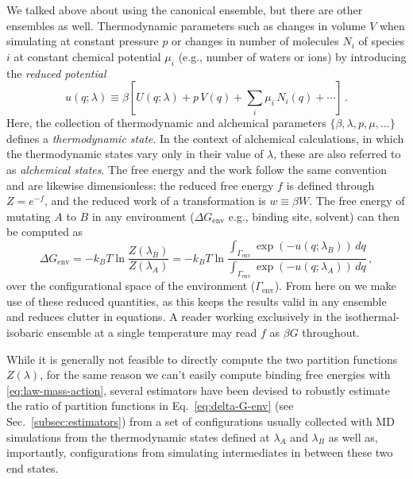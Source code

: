 \documentclass[9pt,bestpractices]{livecoms}
\begin{document}
We talked above about using the canonical ensemble, but there are
other ensembles as well. Thermodynamic parameters such as changes in
volume $V$ when simulating at constant pressure $p$ or changes in
number of molecules $N_i$ of species $i$ at constant chemical
potential $\mu_i$ (e.g., number of waters or ions) by introducing the
\textit{reduced potential}~\cite{shirts2008statisticallya}
\begin{equation}\label{eq:reduced-potential}
u(q;\lambda) \equiv \beta \left[ U(q;\lambda) + p \, V(q) + \sum_i \mu_i \, N_i(q) + \cdots \right] \, .
\end{equation}
Here, the collection of thermodynamic and alchemical parameters $\{\beta, \lambda, p, \mu, \ldots\}$ defines a \emph{thermodynamic state}.
In the context of alchemical calculations, in which the thermodynamic states vary only in their value of $\lambda$, these are also referred to as \emph{alchemical states}.
The free energy and the work follow the same convention and are likewise dimensionless: the reduced free energy $f$ is defined through $Z = e^{-f}$, and the reduced work of a transformation is $w \equiv \beta W$.
The free energy of mutating $A$ to $B$ in any environment ($\Delta G_{\mathrm{env}}$ e.g., binding site, solvent) can then be computed as
\begin{equation}\label{eq:delta-G-env}
    \Delta G_{\mathrm{env}} = - k_BT \ln \frac{Z(\lambda_B)}{Z(\lambda_A)} = - k_BT \ln \frac{\int_{\Gamma_{\mathrm{env}}} \exp\left( -u(q; \lambda_B) \right) \, dq}{\int_{\Gamma_{\mathrm{env}}} \exp\left( -u(q; \lambda_A) \right) \, dq} \, ,
\end{equation}
over the configurational space of the environment ($\Gamma_{\mathrm{env}}$). From here on we make use of these reduced quantities, as this keeps the results valid in any ensemble and reduces clutter in equations. A reader working exclusively in the isothermal-isobaric ensemble at a single temperature may read $f$ as $\beta G$ throughout.

While it is generally not feasible to directly compute the two partition functions $Z(\lambda)$, for the same reason we can't easily compute binding free energies with \ref{eq:law-mass-action}, several estimators have been devised to robustly estimate the ratio of partition functions in Eq.~\ref{eq:delta-G-env} (see Sec.~\ref{subsec:estimators}) from a set of configurations usually collected with MD simulations from the thermodynamic states defined at $\lambda_A$ and $\lambda_B$ as well as, importantly, configurations from simulating  intermediates in between these two end states.
\end{document}
